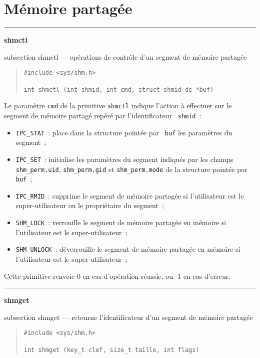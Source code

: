 \documentclass [twoside] {report}
\newcommand {\primitive} [1]
    {
	\phantomsection
	{\large \bf #1}
	\addcontentsline {toc} {subsection} {#1}
    }
\newcommand {\separation}
    {
	\vspace {5mm}
	\nopagebreak
	\hrule
    }
\begin{document}
\section* {Mémoire partagée}

\separation
\primitive {shmctl} --- opérations de contrôle d'un segment de mémoire partagée

\begin {quote}
\begin {verbatim}
#include <sys/shm.h>

int shmctl (int shmid, int cmd, struct shmid_ds *buf)
\end{verbatim}
\end {quote}

Le paramètre {\tt cmd} de la primitive {\tt shmctl} indique l'action à
effectuer sur le segment de mémoire partagé repéré par l'identificateur {\tt
shmid}~:

\begin {itemize}
    \item {\tt IPC\_STAT}~:  place dans la structure pointée par {\tt
	buf} les paramètres du segment~;
    \item {\tt IPC\_SET}~:  initialise les paramètres du segment
	indiqués par les champs {\tt shm\_perm.uid}, {\tt shm\_perm.gid}
	et {\tt shm\_perm.mode} de la structure pointée par {\tt buf}~;
    \item {\tt IPC\_RMID}~:  supprime le segment de mémoire partagée si
	l'utilisateur est le super-utilisateur ou le propriétaire du
	segment~;
    \item {\tt SHM\_LOCK}~:  verrouille le segment de mémoire partagée
	en mémoire si l'utilisateur est le super-utilisateur~;
    \item {\tt SHM\_UNLOCK}~:  déverrouille le segment de mémoire
	partagée en mémoire si l'utilisateur est le super-utilisateur~;
\end {itemize}

Cette primitive renvoie 0 en cas d'opération
réussie, ou -1 en cas d'erreur.



\separation
\primitive {shmget} --- retourne l'identificateur d'un segment de mémoire partagée

\begin {quote}
\begin {verbatim}
#include <sys/shm.h>

int shmget (key_t clef, size_t taille, int flags)
\end{verbatim}
\end {quote}
\end{document}
